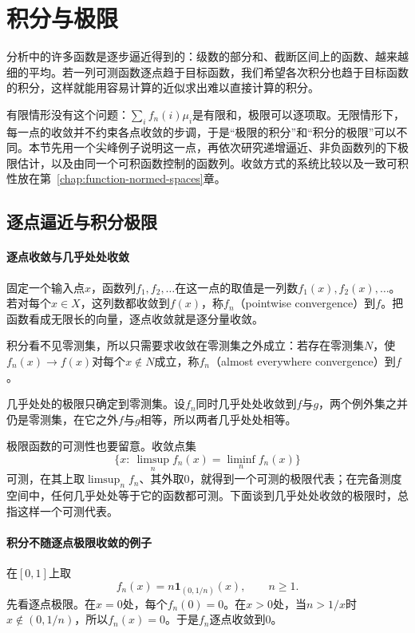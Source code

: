 \section{积分与极限}
\label{sec:integ-limits}

分析中的许多函数是逐步逼近得到的：级数的部分和、截断区间上的函数、越来越细的平均。若一列可测函数逐点趋于目标函数，我们希望各次积分也趋于目标函数的积分，这样就能用容易计算的近似求出难以直接计算的积分。

有限情形没有这个问题：$\sum_if_n(i)\mu_i$是有限和，极限可以逐项取。无限情形下，每一点的收敛并不约束各点收敛的步调，于是“极限的积分”和“积分的极限”可以不同。本节先用一个尖峰例子说明这一点，再依次研究递增逼近、非负函数列的下极限估计，以及由同一个可积函数控制的函数列。收敛方式的系统比较以及一致可积性放在第~\ref{chap:function-normed-spaces}章。

\subsection{逐点逼近与积分极限}
\label{sec:integ-pointwise}

\paragraph{逐点收敛与几乎处处收敛}
固定一个输入点$x$，函数列$f_1,f_2,\dots$在这一点的取值是一列数$f_1(x),f_2(x),\dots$。若对每个$x\in X$，这列数都收敛到$f(x)$，称$f_n$（pointwise convergence）到$f$。把函数看成无限长的向量，逐点收敛就是逐分量收敛。

积分看不见零测集，所以只需要求收敛在零测集之外成立：若存在零测集$N$，使$f_n(x)\to f(x)$对每个$x\notin N$成立，称$f_n$（almost everywhere convergence）到$f$。

几乎处处的极限只确定到零测集。设$f_n$同时几乎处处收敛到$f$与$g$，两个例外集之并仍是零测集，在它之外$f$与$g$相等，所以两者几乎处处相等。

极限函数的可测性也要留意。收敛点集
\[
 \{x:\ \limsup_nf_n(x)=\liminf_nf_n(x)\}
\]
可测，在其上取$\limsup_nf_n$、其外取$0$，就得到一个可测的极限代表；在完备测度空间中，任何几乎处处等于它的函数都可测。下面谈到几乎处处收敛的极限时，总指这样一个可测代表。

\paragraph{积分不随逐点极限收敛的例子}
在$[0,1]$上取
\[
 f_n(x)=n\mathbf 1_{(0,1/n)}(x),\qquad n\geq1.
\]
先看逐点极限。在$x=0$处，每个$f_n(0)=0$。在$x>0$处，当$n>1/x$时$x\notin(0,1/n)$，所以$f_n(x)=0$。于是$f_n$逐点收敛到$0$。

